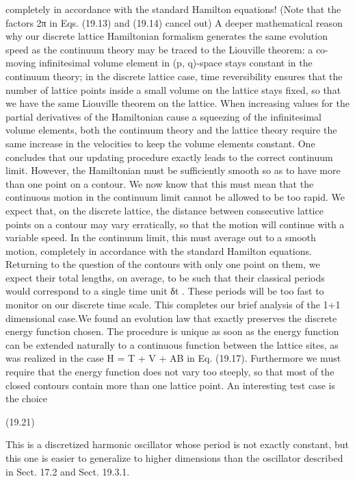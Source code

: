 \documentclass[main.tex]{subfiles}
\begin{document}
completely in accordance with the standard Hamilton equations! (Note that the factors
2π in Eqs. (19.13) and (19.14) cancel out)
A deeper mathematical reason why our discrete lattice Hamiltonian formalism
generates the same evolution speed as the continuum theory may be traced to the
Liouville theorem: a co-moving infinitesimal volume element in (p, q)-space stays
constant in the continuum theory; in the discrete lattice case, time reversibility ensures
that the number of lattice points inside a small volume on the lattice stays fixed,
so that we have the same Liouville theorem on the lattice. When increasing values
for the partial derivatives of the Hamiltonian cause a squeezing of the infinitesimal
volume elements, both the continuum theory and the lattice theory require the same
increase in the velocities to keep the volume elements constant.
One concludes that our updating procedure exactly leads to the correct continuum
limit. However, the Hamiltonian must be sufficiently smooth so as to have more
than one point on a contour. We now know that this must mean that the continuous
motion in the continuum limit cannot be allowed to be too rapid. We expect that, on
the discrete lattice, the distance between consecutive lattice points on a contour may
vary erratically, so that the motion will continue with a variable speed. In the continuum
limit, this must average out to a smooth motion, completely in accordance
with the standard Hamilton equations.
Returning to the question of the contours with only one point on them, we expect
their total lengths, on average, to be such that their classical periods would
correspond to a single time unit δt . These periods will be too fast to monitor on our
discrete time scale.
This completes our brief analysis of the 1+1 dimensional case.We found an evolution
law that exactly preserves the discrete energy function chosen. The procedure
is unique as soon as the energy function can be extended naturally to a continuous
function between the lattice sites, as was realized in the case H = T + V + AB in
Eq. (19.17). Furthermore we must require that the energy function does not vary too
steeply, so that most of the closed contours contain more than one lattice point.
An interesting test case is the choice


(19.21)

This is a discretized harmonic oscillator whose period is not exactly constant, but
this one is easier to generalize to higher dimensions than the oscillator described in
Sect. 17.2 and Sect. 19.3.1.
\end{document}
